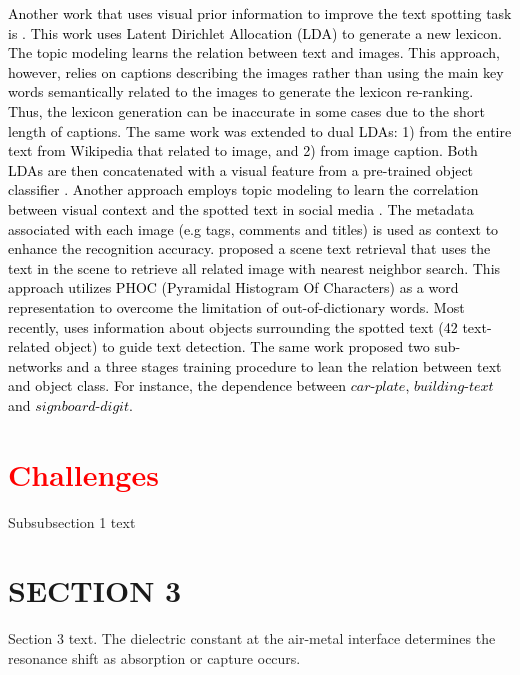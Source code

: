 \documentclass[phd,tocprelim]{cornell}
\begin{document}
 
 \textcolor{black}{Another work that  uses visual prior information to improve the text spotting task is \cite{Yash:16}. This work uses Latent Dirichlet Allocation (LDA) \cite{David:03} to generate a new lexicon. The topic modeling learns the relation between text and images. This approach, however, relies on captions describing the images rather than using the main key words semantically related to the images to generate the lexicon re-ranking. Thus, the lexicon generation can be inaccurate in some cases due to the short length of captions. The same work was  extended to dual LDAs: 1) from the entire text from Wikipedia that related to image, and 2) from image caption. Both LDAs are then concatenated with a visual feature from a pre-trained object classifier \cite{patel2019self}. Another approach employs topic modeling to learn the correlation between visual context and the spotted text in social media \cite{kang2017detection}. The metadata associated with each image (e.g tags, comments and titles) is used as context to enhance the recognition accuracy. \cite{GomezMaflaECCV2018single} proposed  a scene text retrieval that uses the text in the scene to retrieve all related image with nearest neighbor search. This approach utilizes PHOC (Pyramidal Histogram Of Characters) as a word representation to overcome the limitation of out-of-dictionary words. Most recently, \cite{prasad_2018_ECCV} uses information about objects surrounding the spotted text (42 text-related object) to guide text detection. The same work proposed two sub-networks and a three stages training procedure to lean the relation between text and object class. For instance, the dependence between $car$-$plate$, $building$-$text$ and $sign board$-$digit$.}

\section{\textcolor{red}{Challenges}}


Subsubsection 1 text


\section{SECTION 3}
Section 3 text. The dielectric constant at the air-metal interface
determines the resonance shift as absorption or capture occurs.
\end{document}
